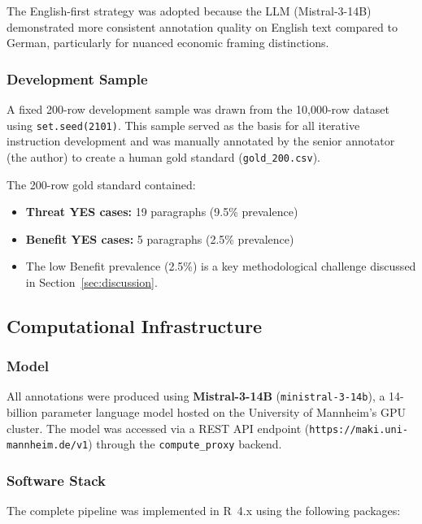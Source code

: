 The English-first strategy was adopted because the LLM (Mistral-3-14B) demonstrated more consistent annotation quality on English text compared to German, particularly for nuanced economic framing distinctions.

\subsubsection{Development Sample}

A fixed 200-row development sample was drawn from the 10,000-row dataset using \texttt{set.seed(2101)}. This sample served as the basis for all iterative instruction development and was manually annotated by the senior annotator (the author) to create a human gold standard (\texttt{gold\_200.csv}).

The 200-row gold standard contained:
\begin{itemize}
    \item \textbf{Threat YES cases:} 19 paragraphs (9.5\% prevalence)
    \item \textbf{Benefit YES cases:} 5 paragraphs (2.5\% prevalence)
    \item The low Benefit prevalence (2.5\%) is a key methodological challenge discussed in Section~\ref{sec:discussion}.
\end{itemize}

\subsection{Computational Infrastructure}

\subsubsection{Model}

All annotations were produced using \textbf{Mistral-3-14B} (\texttt{ministral-3-14b}), a 14-billion parameter language model hosted on the University of Mannheim's GPU cluster. The model was accessed via a REST API endpoint (\texttt{https://maki.uni-mannheim.de/v1}) through the \texttt{compute\_proxy} backend.

\subsubsection{Software Stack}

The complete pipeline was implemented in R~4.x using the following packages:

